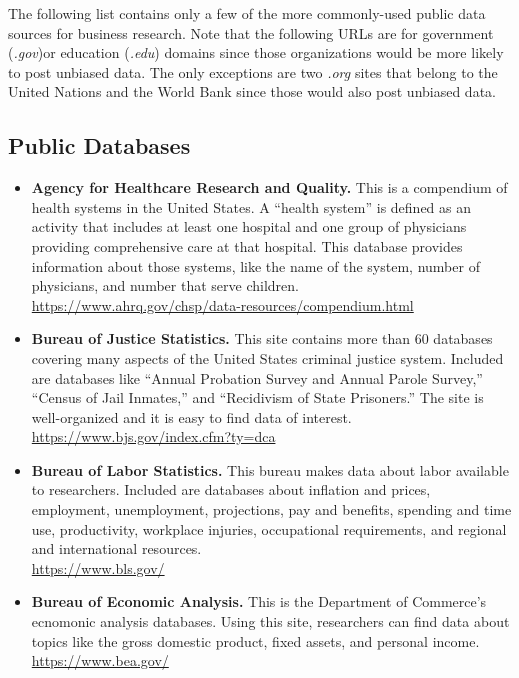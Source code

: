 The following list contains only a few of the more commonly-used public data sources for business research. Note that the following URLs are for government (\textit{.gov})or education (\textit{.edu}) domains since those organizations would be more likely to post unbiased data. The only exceptions are two \textit{.org} sites that belong to the United Nations and the World Bank since those would also post unbiased data.

\subsection{Public Databases}

\begin{itemize}
	
	\item \textbf{Agency for Healthcare Research and Quality.} This is a compendium of health systems in the United States. A ``health system'' is defined as an activity that includes at least one hospital and one group of physicians providing comprehensive care at that hospital. This database provides information about those systems, like the name of the system, number of physicians, and number that serve children. 
	\\ \url{https://www.ahrq.gov/chsp/data-resources/compendium.html}

	\item \textbf{Bureau of Justice Statistics.} This site contains more than 60 databases covering many aspects of the United States criminal justice system. Included are databases like ``Annual Probation Survey and Annual Parole Survey,'' ``Census of Jail Inmates,'' and ``Recidivism of State Prisoners.'' The site is well-organized and it is easy to find data of interest.
	\\ \url{https://www.bjs.gov/index.cfm?ty=dca}

	\item \textbf{Bureau of Labor Statistics.} This bureau makes data about labor available to researchers. Included are databases about inflation and prices, employment, unemployment, projections, pay and benefits, spending and time use, productivity, workplace injuries, occupational requirements, and regional and international resources.
	\\ \url{https://www.bls.gov/}

	\item \textbf{Bureau of Economic Analysis.} This is the Department of Commerce's ecnomonic analysis databases. Using this site, researchers can find data about topics like the gross domestic product, fixed assets, and personal income.
	\\ \url{https://www.bea.gov/}


\end{itemize}
